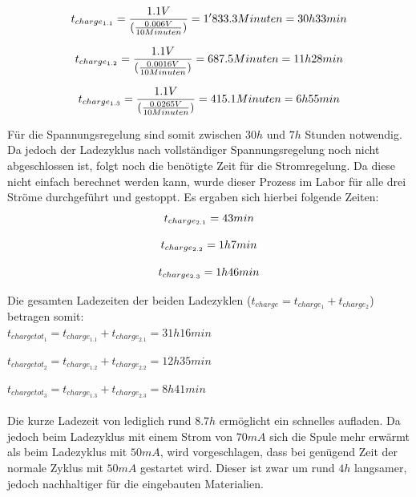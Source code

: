 \begin{equation}
\centering
t_{charge_{1.1}}=\frac{1.1 V}{(\frac{0.006 V}{10 Minuten})}=1'833.3 Minuten= 30h 33min
\label{eq:LadezeitSpannungsregelung1}
\end{equation}

\begin{equation}
\centering
t_{charge_{1.2}}=\frac{1.1 V}{(\frac{0.0016 V}{10 Minuten})}=687.5 Minuten= 11h 28min
\label{eq:LadezeitSpannungsregelung2}
\end{equation}

\begin{equation}
\centering
t_{charge_{1.3}}=\frac{1.1 V}{(\frac{0.0265 V}{10 Minuten})}=415.1 Minuten= 6h 55min
\label{eq:LadezeitSpannungsregelung3}
\end{equation}

Für die Spannungsregelung sind somit zwischen $30h$ und $7h$ Stunden notwendig. Da jedoch der Ladezyklus nach vollständiger Spannungsregelung noch nicht abgeschlossen ist, folgt noch die benötigte Zeit für die Stromregelung. Da diese nicht einfach berechnet werden kann, wurde dieser Prozess im Labor für alle drei Ströme durchgeführt und gestoppt. Es ergaben sich hierbei folgende Zeiten:
\begin{equation}
\centering
t_{charge_{2.1}}= 43min
\label{eq:LadezeitStromregelung1}
\end{equation}

\begin{equation}
\centering
t_{charge_{2.2}}= 1h 7min
\label{eq:LadezeitStromregelung2}
\end{equation}

\begin{equation}
\centering
t_{charge_{2.3}}= 1h 46min
\label{eq:LadezeitStromregelung3}
\end{equation}


Die gesamten Ladezeiten der beiden Ladezyklen ($t_{charge}=t_{charge_{1}}+t_{charge_{2}}$) betragen somit:\\

$t_{charge tot_{1}}=t_{charge_{1.1}}+t_{charge_{2.1}}=31h 16min$
 
$t_{charge tot_{2}}=t_{charge_{1.2}}+t_{charge_{2.2}}=12h 35min$
 
$t_{charge tot_{3}}=t_{charge_{1.3}}+t_{charge_{2.3}}=8h 41min$\\
\\
Die kurze Ladezeit von lediglich rund $8.7h$ ermöglicht ein schnelles aufladen. Da jedoch beim Ladezyklus mit einem Strom von $70mA$ sich die Spule mehr erwärmt als beim Ladezyklus mit $50mA$, wird vorgeschlagen, dass bei genügend Zeit der normale Zyklus mit $50mA$ gestartet wird. Dieser ist zwar um rund $4h$ langsamer, jedoch nachhaltiger für die eingebauten Materialien.

